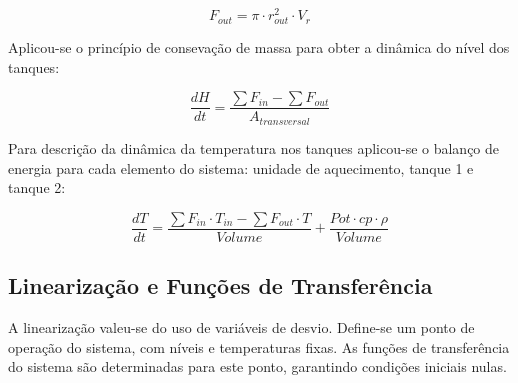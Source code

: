 \documentclass[a0,portrait]{a0poster}
\begin{document}
\begin{multicols}{2}
\vspace{0.2cm}
\begin{equation}
F_{out} = \pi \cdot r_{out}^{2} \cdot V_r
\end{equation}
\vspace{0.4cm}

Aplicou-se o princípio de consevação de massa para obter a dinâmica do nível dos tanques:

\vspace{0.2cm}
\begin{equation}
\frac{dH}{dt} =  \frac{\sum F_{in} - \sum F_{out}}{A_{transversal}}
\end{equation}
\vspace{0.4cm}


Para descrição da dinâmica da temperatura nos tanques aplicou-se o balanço de energia para cada elemento do sistema: unidade de aquecimento, tanque 1 e tanque 2:

\vspace{0.2cm}
\begin{equation}
\frac{dT}{dt} =  \frac{\sum{F_{in} \cdot T_{in}} - \sum{F_{out} \cdot T}}{Volume} + \frac{Pot \cdot cp \cdot \rho}{Volume}
\end{equation}
\vspace{0.2cm}



\color{DarkSlateGray} %

\subsection*{Linearização e Funções de Transferência}

\color{Black}

A linearização valeu-se do uso de variáveis de desvio. Define-se um ponto de operação do sistema, com níveis e temperaturas fixas. As funções de transferência do sistema são determinadas para este ponto, garantindo condições iniciais nulas. 


\vspace{1cm}
\color{DarkSlateGray} %


\end{multicols}
\end{document}
